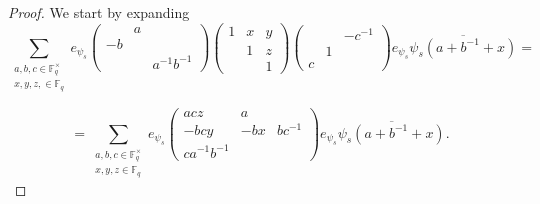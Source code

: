 \documentclass[12pt,reqno]{amsart}
\theoremstyle{definition}
\theoremstyle{remark}
\numberwithin{equation}{section}
\begin{document}
\begin{proof}
    We start by expanding
    \begin{equation*}
        \sum_{\substack{a, b, c \in \mathbb{F}_q^\times\\x, y, z, \in \mathbb{F}_q}}e_{\psi_s} \begin{pmatrix}
            & a &\\
            -b & &\\
            & & a^{-1}b^{-1}
        \end{pmatrix} \begin{pmatrix}
            1 & x & y\\
            & 1 & z\\
            & & 1
        \end{pmatrix} \begin{pmatrix}
            & & -c^{-1}\\
            & 1 &\\
            c & &
        \end{pmatrix} e_{\psi_s} \overline{\psi_s(a+b^{-1}+x)}=
    \end{equation*}

    \begin{equation*}
        =\sum_{\substack{a, b, c \in \mathbb{F}_q^\times\\x, y, z \in \mathbb{F}_q}}e_{\psi_s} \begin{pmatrix}
            acz & a &\\
            -bcy & -bx & bc^{-1}\\
            ca^{-1}b^{-1} & &
        \end{pmatrix} e_{\psi_s} \overline{\psi_s(a+b^{-1}+x)}.
    \end{equation*}


\end{proof}
\end{document}
